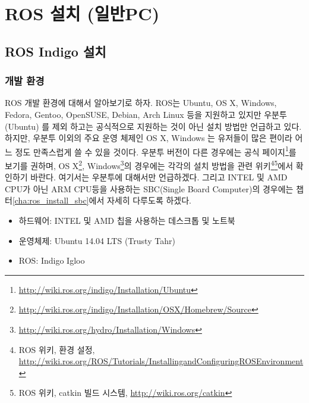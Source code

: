 
\chapter{ROS 설치 (일반PC)}

\section{ROS Indigo 설치}

\subsection{개발 환경}

ROS 개발 환경에 대해서 알아보기로 하자. ROS는 Ubuntu, OS X, Windows, Fedora, Gentoo, OpenSUSE, Debian, Arch Linux 등을 지원하고 있지만 우분투(Ubuntu) 를 제외 하고는 공식적으로 지원하는 것이 아닌 설치 방법만 언급하고 있다. 하지만, 우분투 이외의 주요 운영 체제인 OS X, Windows 는 유저들이 많은 편이라 어느 정도 만족스럽게 쓸 수 있을 것이다. 우분투 버전이 다른 경우에는 공식 페이지\footnote{\url{http://wiki.ros.org/indigo/Installation/Ubuntu}}를 보기를 권하며, OS X\footnote{\url{http://wiki.ros.org/indigo/Installation/OSX/Homebrew/Source}}, Windows\footnote{\url{http://wiki.ros.org/hydro/Installation/Windows}}의 경우에는 각각의 설치 방법을 관련 위키\footnote{ROS 위키, 환경 설정, \url{http://wiki.ros.org/ROS/Tutorials/InstallingandConfiguringROSEnvironment}}\footnote{ROS 위키, catkin 빌드 시스템, \url{http://wiki.ros.org/catkin}}에서 확인하기 바란다. 여기서는 우분투에 대해서만 언급하겠다. 그리고 INTEL 및 AMD CPU가 아닌 ARM CPU등을 사용하는 SBC(Single Board Computer)의 경우에는 챕터\ref{cha:ros_install_sbc}에서 자세히 다루도록 하겠다.
\\
\begin{itemize}
\item 하드웨어: INTEL 및 AMD 칩을 사용하는 데스크톱 및 노트북 
\item 운영체제: Ubuntu 14.04 LTS (Trusty Tahr)
\item ROS: Indigo Igloo
\end{itemize}

